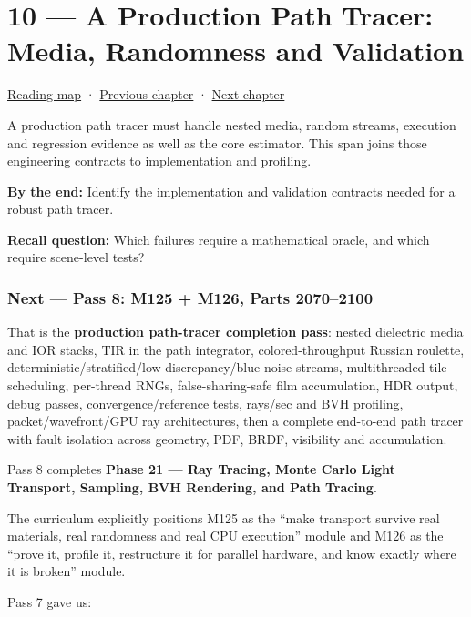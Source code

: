 \hypertarget{03-visual-computing-i-ch010}{}
\chapter{10 --- A Production Path Tracer: Media, Randomness and Validation}\label{03-visual-computing-i-ch010-a-production-path-tracer-media-randomness-and-validation}

\hyperref[volume-reading-map]{Reading map} · \hyperref[03-visual-computing-i-ch009]{Previous chapter} · \hyperref[03-visual-computing-i-ch011]{Next chapter}

A production path tracer must handle nested media, random streams, execution and regression evidence as well as the core estimator. This span joins those engineering contracts to implementation and profiling.

\textbf{By the end:} Identify the implementation and validation contracts needed for a robust path tracer.

\textbf{Recall question:} Which failures require a mathematical oracle, and which require scene-level tests?

\subsection{Next --- Pass 8: M125 + M126, Parts 2070--2100}\label{03-visual-computing-i-ch010-next-pass-8-m125-m126-parts-20702100}

That is the \textbf{production path-tracer completion pass}: nested dielectric media and IOR stacks, TIR in the path integrator, colored-throughput Russian roulette, deterministic/stratified/low-discrepancy/blue-noise streams, multithreaded tile scheduling, per-thread RNGs, false-sharing-safe film accumulation, HDR output, debug passes, convergence/reference tests, rays/sec and BVH profiling, packet/wavefront/GPU ray architectures, then a complete end-to-end path tracer with fault isolation across geometry, PDF, BRDF, visibility and accumulation.

Pass 8 completes \textbf{Phase 21 --- Ray Tracing, Monte Carlo Light Transport, Sampling, BVH Rendering, and Path Tracing}.

The curriculum explicitly positions M125 as the ``make transport survive real materials, real randomness and real CPU execution'' module and M126 as the ``prove it, profile it, restructure it for parallel hardware, and know exactly where it is broken'' module.

Pass 7 gave us:

